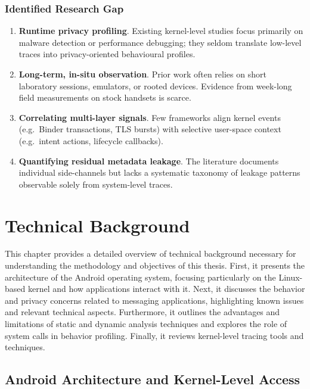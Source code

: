 \documentclass[a4paper,12pt]{report}
\begin{document}
\subsection*{Identified Research Gap}
\begin{enumerate}
  \item \textbf{Runtime privacy profiling}. Existing kernel-level studies focus primarily on malware detection or performance debugging; they seldom translate low-level traces into privacy-oriented behavioural profiles.
  \item \textbf{Long-term, in-situ observation}. Prior work often relies on short laboratory sessions, emulators, or rooted devices. Evidence from week-long field measurements on stock handsets is scarce.
  \item \textbf{Correlating multi-layer signals}. Few frameworks align kernel events (e.g.\ Binder transactions, TLS bursts) with selective user-space context (e.g.\ intent actions, lifecycle callbacks).
  \item \textbf{Quantifying residual metadata leakage}. The literature documents individual side-channels but lacks a systematic taxonomy of leakage patterns observable solely from system-level traces.
\end{enumerate}


\chapter{Technical Background}

This chapter provides a detailed overview of technical background necessary for understanding the methodology and objectives of this thesis. First, it presents the architecture of the Android operating system, focusing particularly on the Linux-based kernel and how applications interact with it. Next, it discusses the behavior and privacy concerns related to messaging applications, highlighting known issues and relevant technical aspects. Furthermore, it outlines the advantages and limitations of static and dynamic analysis techniques and explores the role of system calls in behavior profiling. Finally, it reviews kernel-level tracing tools and techniques.
\section{Android Architecture and Kernel-Level Access}
\end{document}
